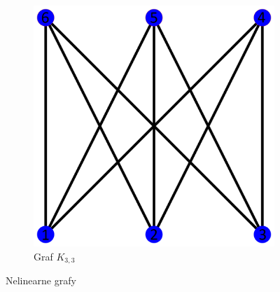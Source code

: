 \begin{figure}[h]
\begin{subfigure}[b]{0.3\textwidth}
        \includegraphics[width=\textwidth]{doc/fig/K33.png}
        \caption{Graf $K_{3,3}$}
        \label{fig:graph-k33}
    \end{subfigure}
    \caption{Nelinearne grafy}
    \label{fig:non_planar_graphs}
\end{figure}